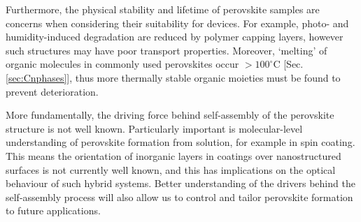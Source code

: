 Furthermore, the physical stability and lifetime of perovskite samples are concerns when considering their suitability for devices. For example, photo- and humidity-induced degradation are reduced by polymer capping layers, however such structures may have poor transport properties. Moreover, `melting' of organic molecules in commonly used perovskites occur $>100^{\circ}$C [Sec.\,\ref{sec:Cnphases}], thus more thermally stable organic moieties must be found to prevent deterioration. 

More fundamentally, the driving force behind self-assembly of the perovskite structure is not well known. Particularly important is molecular-level understanding of perovskite formation from solution, for example in spin coating. This means the orientation of inorganic layers in coatings over nanostructured surfaces is not currently well known, and this has implications on the optical behaviour of such hybrid systems. Better understanding of the drivers behind the self-assembly process will also allow us to control and tailor perovskite formation to future applications.